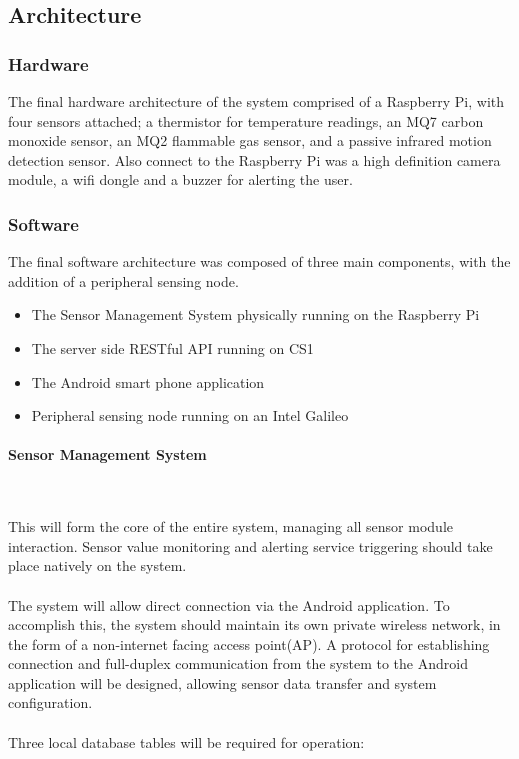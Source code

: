 \documentclass{article}
\begin{document}
\subsection{Architecture}

\subsubsection{Hardware}
The final hardware architecture of the system comprised of a Raspberry Pi, with four sensors attached; a thermistor for temperature readings, an MQ7 carbon monoxide sensor, an MQ2 flammable gas sensor, and a passive infrared motion detection sensor. Also connect to the Raspberry Pi was a high definition camera module, a wifi dongle and a buzzer for alerting the user.


\subsubsection{Software}
The final software architecture was composed of three main components, with the addition of a peripheral sensing node.

\begin{itemize}
  \item The Sensor Management System physically running on the Raspberry Pi
  \item The server side RESTful API running on CS1
  \item The Android smart phone application
  \item Peripheral sensing node running on an Intel Galileo 
\end{itemize}

\paragraph{Sensor Management System}\

This will form the core of the entire system, managing all sensor module interaction. Sensor value monitoring and alerting service triggering should take place natively on the system. \\\\ The system will allow direct connection via the Android application. To accomplish this, the system should maintain its own private wireless network, in the form of a non-internet facing access point(AP). A protocol for establishing connection and full-duplex communication from the system to the Android application will be designed, allowing sensor data transfer and system configuration. \\\\ Three local database tables will be required for operation:
\end{document}
